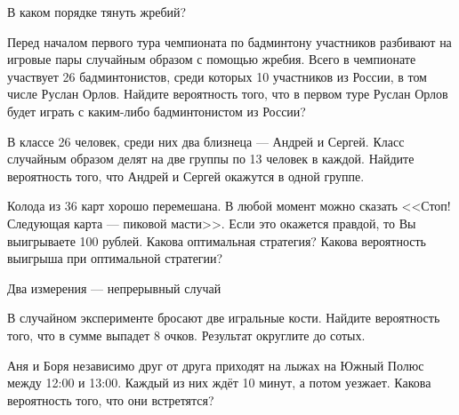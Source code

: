 \documentclass[pdftex,unicode]{beamer}
\begin{document}
\begin{frame}{В каком порядке тянуть жребий?}

\begin{block}{}
Перед началом первого тура чемпионата по бадминтону участников разбивают на игровые пары случайным образом с помощью жребия. Всего в чемпионате участвует 26 бадминтонистов, среди которых 10 участников из России, в том числе Руслан Орлов. Найдите вероятность того, что в первом туре Руслан Орлов будет играть с каким-либо бадминтонистом из России?
\end{block}

\begin{block}{}
В классе 26 человек, среди них два близнеца  — Андрей и Сергей. Класс случайным образом делят на две группы по 13 человек в каждой. Найдите вероятность того, что Андрей и Сергей окажутся в одной группе.
\end{block}


\begin{block}{}
Колода из 36 карт хорошо перемешана. В любой момент можно сказать <<Стоп! Следующая карта --- пиковой масти>>. Если это окажется правдой, то Вы выигрываете 100 рублей. Какова оптимальная стратегия? Какова вероятность выигрыша при оптимальной стратегии? 
\end{block}

\end{frame}




\begin{frame}{Два измерения --- непрерывный случай}

\begin{block}{}
В случайном эксперименте бросают две игральные кости. Найдите вероятность того, что в сумме выпадет 8 очков. Результат округлите до сотых.
\end{block}


\begin{block}{}
Аня и Боря независимо друг от друга приходят на лыжах на Южный Полюс между 12:00 и 13:00. Каждый из них ждёт 10 минут, а потом уезжает. Какова вероятность того, что они встретятся?
\end{block}



\end{frame}
\end{document}
